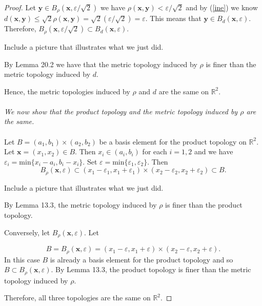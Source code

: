 \documentclass[12pt]{report}
\newcommand{\R}{\mathbb{R}^2}
\newcommand{\x}{\mathbf{x}}
\newcommand{\y}{\mathbf{y}}
\begin{document}
\begin{proof}
Let $\y \in B_\rho(\x, \varepsilon/\sqrt{2})$ we have $\rho(\x,\y) < \varepsilon/\sqrt{2}$ and by (\ref{ine}) we know $d(\x,\y) \leq \sqrt{2}\rho(\x, \y) = \sqrt{2} (\varepsilon/\sqrt{2}) = \varepsilon$. This means that $\y \in B_d(\x, \varepsilon)$. Therefore, $B_\rho(\x, \varepsilon/\sqrt{2}) \subset B_d(\x, \varepsilon)$. 
\begin{center}
{\color{red}Include a picture that illustrates what we just did.}
\end{center}
\vspace{2in}
By Lemma 20.2 we have that the metric topology induced by $\rho $ is finer than the metric topology induced by $d$. 

Hence, the metric topologies induced by $\rho$ and $d$ are the same on $\R$.
\\\\
\emph{We now show that the product topology and the metric topology induced by $\rho$ are the same.}\\\\

Let $B = (a_1,b_1) \times (a_2,b_2)$ be a basis element for the product topology on $\R$. Let $\x = (x_1, x_2) \in B$. Then  $x_i \in (a_i, b_i)$ for each $i =1,2$ and we have $\varepsilon_i = \text{min}\{ x_i - a_i, b_i - x_i\}$. Set $\varepsilon = \text{min} \{ \varepsilon_1 , \varepsilon_2 \}$. Then 
\[ B_\rho (\x, \varepsilon) \subset (x_1-\varepsilon_1 , x_1+ \varepsilon_1) \times (x_2-\varepsilon_2 , x_2+ \varepsilon_2) \subset B. \]

\begin{center}
{\color{red}Include a picture that illustrates what we just did.}
\end{center}
\vspace{2in}
By Lemma 13.3, the metric topology induced by $\rho$ is finer than the product topology.

Conversely, let $B_\rho (\x, \varepsilon)$. Let 

\[B= B_\rho(\x, \varepsilon) = (x_1 - \varepsilon , x_1 + \varepsilon) \times (x_2 - \varepsilon, x_2 + \varepsilon).\]
In this case $B$ is already a basis element for the product topology and so $B \subset B_\rho(\x, \varepsilon)$. By Lemma 13.3, the product topology is finer than the metric topology induced by $\rho$. 

Therefore, all three topologies are the same on $\R$.

\end{proof}
\end{document}
